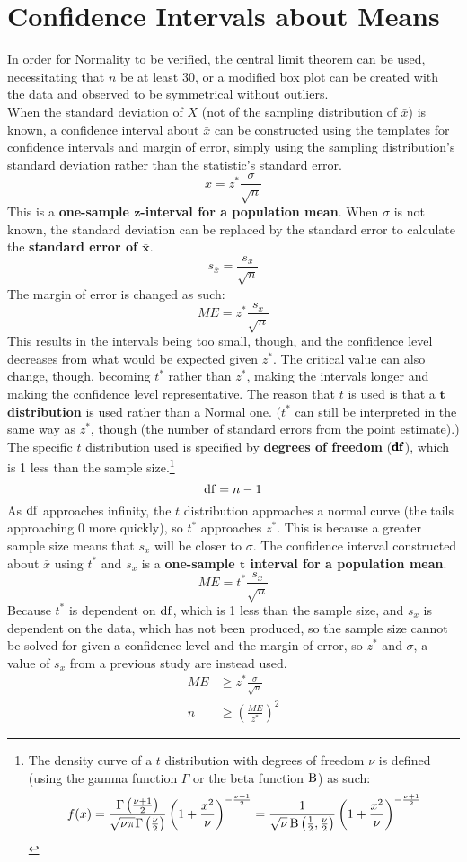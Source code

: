 \documentclass[../AP_Statistics.tex]{subfiles}
\begin{document}
		\section{Confidence Intervals about Means}
			In order for Normality to be verified, the central limit theorem can be used, necessitating that $n$ be at least 30, or a modified box plot can be created with the data and observed to be symmetrical without outliers. \\
			When the standard deviation of $X$ (not of the sampling distribution of $\bar{x}$) is known, a confidence interval about $\bar{x}$ can be constructed using the templates for confidence intervals and margin of error, simply using the sampling distribution's standard deviation rather than the statistic's standard error.
			\[\bar{x} = z^*\frac{\sigma}{\sqrt{n}}\]
			This is a \textbf{one-sample $\pmb{z}$-interval for a population mean}.
			When $\sigma$ is not known, the standard deviation can be replaced by the standard error to calculate the \textbf{standard error of $\pmb{\bar{x}}$}.
			\[s_{\bar{x}} = \frac{s_x}{\sqrt{n}}\]
			The margin of error is changed as such:
			\[ME = z^*\frac{s_x}{\sqrt{n}}\]
			This results in the intervals being too small, though, and the confidence level decreases from what would be expected given $z^*$. The critical value can also change, though, becoming $t^*$ rather than $z^*$, making the intervals longer and making the confidence level representative. The reason that $t$ is used is that a $\pmb{t}$\textbf{ distribution} is used rather than a Normal one. ($t^*$ can still be interpreted in the same way as $z^*$, though (the number of standard errors from the point estimate).) \\
			The specific $t$ distribution used is specified by \textbf{degrees of freedom} ($\pmb{\operatorname{\mathrm{df}}}$), which  is 1 less than the sample size.\footnote{The density curve of a $t$ distribution with degrees of freedom $\nu$ is defined (using the gamma function $\Gamma$ or the beta function $\operatorname{\mathrm{B}}$) as such:\[f(x) = \frac{\Gamma\left(\frac{\nu + 1}{2}\right)}{\sqrt{\nu\pi}\Gamma\left(\frac{\nu}{2}\right)}\left(1 + \frac{x^2}{\nu}\right)^{-\frac{\nu + 1}{2}} = \frac{1}{\sqrt{\nu}\operatorname{\mathrm{B}}\left(\frac{1}{2},\frac{\nu}{2}\right)}\left(1 + \frac{x^2}{\nu}\right)^{-\frac{\nu + 1}{2}}\]} \\
			\[\operatorname{\mathrm{df}} = n - 1\]
			As $\operatorname{\mathrm{df}}$ approaches infinity, the $t$ distribution approaches a normal curve (the tails approaching 0 more quickly), so $t^*$ approaches $z^*$. This is because a greater sample size means that $s_x$ will be closer to $\sigma$.
			The confidence interval constructed about $\bar{x}$ using $t^*$ and $s_x$ is a \textbf{one-sample $\pmb{t}$ interval for a population mean}.
			\[ME = t^*\frac{s_x}{\sqrt{n}}\]
			Because $t^*$ is dependent on $\operatorname{\mathrm{df}}$, which is 1 less than the sample size, and $s_x$ is dependent on the data, which has not been produced, so the sample size cannot be solved for given a confidence level and the margin of error, so $z^*$ and $\sigma$, a value of $s_x$ from a previous study are instead used.
			\begin{align*}
				ME &\ge z^*\frac{\sigma}{\sqrt{n}} \\
				n &\ge \left(\frac{ME}{z^*}\right)^2
			\end{align*}
\end{document}
